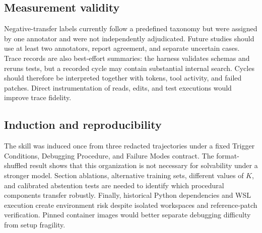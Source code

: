 \subsection{Measurement validity}

Negative-transfer labels currently follow a predefined taxonomy but were
assigned by one annotator and were not independently adjudicated. Future
studies should use at least two annotators, report agreement, and separate
uncertain cases. Trace
records are also best-effort summaries: the harness validates schemas and
reruns tests, but a recorded cycle may contain substantial internal search.
Cycles should therefore be interpreted together with tokens, tool activity,
and failed patches. Direct instrumentation of reads, edits, and test executions
would improve trace fidelity.

\subsection{Induction and reproducibility}

The skill was induced once from three redacted trajectories under a fixed
Trigger Conditions, Debugging Procedure, and Failure Modes contract. The
format-shuffled result shows that this organization is not necessary for
solvability under a stronger model. Section ablations, alternative training
sets, different values of $K$, and calibrated abstention tests are needed to
identify which procedural components transfer robustly. Finally, historical
Python dependencies and WSL execution create environment risk despite isolated
workspaces and reference-patch verification. Pinned container images would
better separate debugging difficulty from setup fragility.
